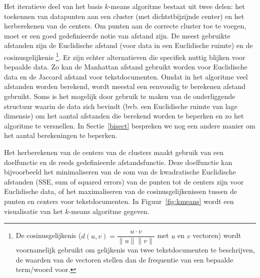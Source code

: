 \documentclass[a4paper,12pt]{article}
\theoremstyle{definition}
\begin{document}
Het iteratieve deel van het basis $k$-means algoritme bestaat uit twee delen: het toekennen
van datapunten aan een cluster (met dichtstbijzijnde center) en het herberekenen van
de centers. Om punten aan de correcte cluster toe te voegen, moet er een goed gedefinieerde
notie van afstand zijn. De meest gebruikte afstanden zijn de Euclidische afstand
(voor data in een Euclidische ruimte) en de cosinusgelijkenis
\footnote{De cosinusgelijkenis ($d(u,v) = \dfrac{u\cdot v}{\|u\|\|v\|}$ met 
$u$ en $v$ vectoren) wordt voornamelijk gebruikt om gelijkenis van twee 
tekstdocumenten te beschrijven, de waarden van de vectoren stellen dan de 
frequentie van een bepaalde term/woord voor.}. Er zijn echter alternatieven 
die specifiek nuttig blijken voor bepaalde data. Zo kan de Manhattan afstand gebruikt 
worden voor Euclidische data en de Jaccard afstand voor tekstdocumenten. Omdat in 
het algoritme veel afstanden worden berekend, wordt
meestal een eenvoudig te berekenen afstand gebruikt. Soms is het mogelijk door gebruik te 
maken van de onderliggende structuur waarin de data zich bevindt (bvb. een 
Euclidische ruimte van lage dimensie) om het aantal afstanden die berekend worden 
te beperken en zo het algoritme te versnellen. In Sectie~\ref{bisect} bespreken we 
nog een andere manier om het aantal berekeningen te beperken.

Het herberekenen van de centers van de clusters maakt gebruik van een
doelfunctie en de reeds gedefinieerde afstandsfunctie. Deze doelfunctie kan 
bijvoorbeeld het minimaliseren van de som van de kwadratische Euclidische
afstanden (SSE, sum of squared errors) van de punten tot de centers
zijn voor Euclidische data, of het maximaliseren van de cosinusgelijkenissen 
tussen de punten en centers voor tekstdocumenten.
In Figuur~\ref{fig:kmeans} wordt een visualisatie van het $k$-means algoritme gegeven.
\end{document}
